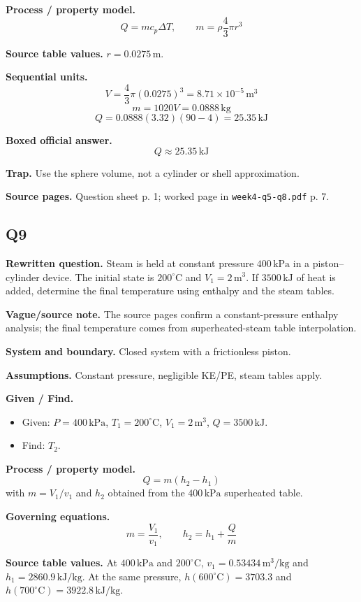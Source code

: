 \textbf{Process / property model.}
\[
Q=mc_p\Delta T,\qquad m=\rho\frac{4}{3}\pi r^3
\]

\textbf{Source table values.} $r=0.0275\,\text{m}$.

\textbf{Sequential units.}
\[
V=\frac{4}{3}\pi(0.0275)^3=8.71\times 10^{-5}\,\text{m}^3
\]
\[
m=1020V=0.0888\,\text{kg}
\]
\[
Q=0.0888(3.32)(90-4)=25.35\,\text{kJ}
\]

\textbf{Boxed official answer.}
\[
\boxed{Q\approx 25.35\,\text{kJ}}
\]

\textbf{Trap.} Use the sphere volume, not a cylinder or shell approximation.

\textbf{Source pages.} Question sheet p. 1; worked page in \texttt{week4-q5-q8.pdf} p. 7.

\subsection*{Q9}
\textbf{Rewritten question.} Steam is held at constant pressure $400\,\text{kPa}$ in a piston--cylinder device. The initial state is $200^\circ\text{C}$ and $V_1=2\,\text{m}^3$. If $3500\,\text{kJ}$ of heat is added, determine the final temperature using enthalpy and the steam tables.

\textbf{Vague/source note.} The source pages confirm a constant-pressure enthalpy analysis; the final temperature comes from superheated-steam table interpolation.

\textbf{System and boundary.} Closed system with a frictionless piston.

\textbf{Assumptions.} Constant pressure, negligible KE/PE, steam tables apply.

\textbf{Given / Find.}
\begin{itemize}
  \item Given: $P=400\,\text{kPa}$, $T_1=200^\circ\text{C}$, $V_1=2\,\text{m}^3$, $Q=3500\,\text{kJ}$.
  \item Find: $T_2$.
\end{itemize}

\textbf{Process / property model.}
\[
Q=m(h_2-h_1)
\]
with $m=V_1/v_1$ and $h_2$ obtained from the $400\,\text{kPa}$ superheated table.

\textbf{Governing equations.}
\[
m=\frac{V_1}{v_1},\qquad h_2=h_1+\frac{Q}{m}
\]

\textbf{Source table values.} At $400\,\text{kPa}$ and $200^\circ\text{C}$, $v_1=0.53434\,\text{m}^3/\text{kg}$ and $h_1=2860.9\,\text{kJ/kg}$. At the same pressure, $h(600^\circ\text{C})=3703.3$ and $h(700^\circ\text{C})=3922.8\,\text{kJ/kg}$.

